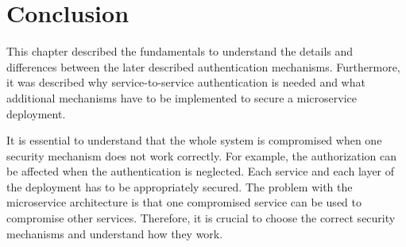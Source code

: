 \section{Conclusion}
This chapter described the fundamentals to understand the details and differences between the later described authentication mechanisms.
Furthermore, it was described why service-to-service authentication is needed and what additional mechanisms have to be implemented to secure a microservice deployment.

It is essential to understand that the whole system is compromised when one security mechanism does not work correctly.
For example, the authorization can be affected when the authentication is neglected.
Each service and each layer of the deployment has to be appropriately secured.
The problem with the microservice architecture is that one compromised service can be used to compromise other services.
Therefore, it is crucial to choose the correct security mechanisms and understand how they work. 

